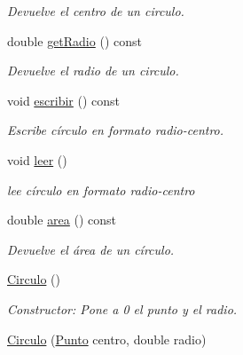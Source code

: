 \begin{DoxyCompactItemize}
\begin{DoxyCompactList}\small\item\em Devuelve el centro de un circulo. \end{DoxyCompactList}\item 
double \hyperlink{classCirculo_a982f8a785d8a68ab1483b609cd752980}{get\+Radio} () const \hypertarget{classCirculo_a982f8a785d8a68ab1483b609cd752980}{}\label{classCirculo_a982f8a785d8a68ab1483b609cd752980}

\begin{DoxyCompactList}\small\item\em Devuelve el radio de un circulo. \end{DoxyCompactList}\item 
void \hyperlink{classCirculo_a2deaed49ea394702beb0554f9480137e}{escribir} () const \hypertarget{classCirculo_a2deaed49ea394702beb0554f9480137e}{}\label{classCirculo_a2deaed49ea394702beb0554f9480137e}

\begin{DoxyCompactList}\small\item\em Escribe círculo en formato radio-\/centro. \end{DoxyCompactList}\item 
void \hyperlink{classCirculo_aa71efffb3b42eeaefd43743a8d34aa74}{leer} ()\hypertarget{classCirculo_aa71efffb3b42eeaefd43743a8d34aa74}{}\label{classCirculo_aa71efffb3b42eeaefd43743a8d34aa74}

\begin{DoxyCompactList}\small\item\em lee círculo en formato radio-\/centro \end{DoxyCompactList}\item 
double \hyperlink{classCirculo_a532d4f2bd03b688403c4370319411dc3}{area} () const \hypertarget{classCirculo_a532d4f2bd03b688403c4370319411dc3}{}\label{classCirculo_a532d4f2bd03b688403c4370319411dc3}

\begin{DoxyCompactList}\small\item\em Devuelve el área de un círculo. \end{DoxyCompactList}\item 
\hyperlink{classCirculo_a6933bf908b78a4167684081a3a8f257f}{Circulo} ()\hypertarget{classCirculo_a6933bf908b78a4167684081a3a8f257f}{}\label{classCirculo_a6933bf908b78a4167684081a3a8f257f}

\begin{DoxyCompactList}\small\item\em Constructor\+: Pone a 0 el punto y el radio. \end{DoxyCompactList}\item 
\hyperlink{classCirculo_ad4c6c76f0227c25afcb872a8744ebe56}{Circulo} (\hyperlink{classPunto}{Punto} centro, double radio)\hypertarget{classCirculo_ad4c6c76f0227c25afcb872a8744ebe56}{}\label{classCirculo_ad4c6c76f0227c25afcb872a8744ebe56}


\end{DoxyCompactItemize}
